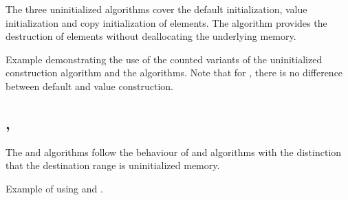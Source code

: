 The three uninitialized algorithms cover the default initialization, value initialization and copy initialization of elements. The  algorithm provides the destruction of elements without deallocating the underlying memory.



\begin{box-note}
\footnotesize 
Example demonstrating the use of the counted variants of the uninitialized construction algorithm and the  algorithms. Note that for , there is no difference between default and value construction.
\tcblower
{}
\end{box-note}

\subsection{\texorpdfstring{, }{\texttt{std::uninitialized\_copy}, \texttt{std::uninitalized\_move}}}

The  and  algorithms follow the behaviour of  and  algorithms with the distinction that the destination range is uninitialized memory.



\begin{box-note}
\footnotesize Example of using  and .
\tcblower
{}
\end{box-note}

